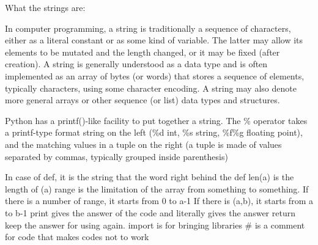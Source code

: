 What the strings are:

In computer programming, a string is traditionally a sequence of characters, either as a literal constant or as some kind of variable. The latter may allow its elements to be mutated and the length changed, or it may be fixed (after creation). A string is generally understood as a data type and is often implemented as an array of bytes (or words) that stores a sequence of elements, typically characters, using some character encoding. A string may also denote more general arrays or other sequence (or list) data types and structures.

Python has a printf()-like facility to put together a string. The \% operator takes a printf-type format string on the left (\%d int, \%s string, \%f\%g floating point), and the matching values in a tuple on the right (a tuple is made of values separated by commas, typically grouped inside parenthesis)

In case of def, it is the string that the word right behind the def
len(a) is the length of (a)
range is the limitation of the array from something to something. If there is a number of range, it starts from 0 to a-1
If there is (a,b), it starts from a to b-1
print gives the answer of the code and literally gives the answer
return keep the answer for using again.
import is for bringing libraries
\# is a comment for code that makes codes not to work
